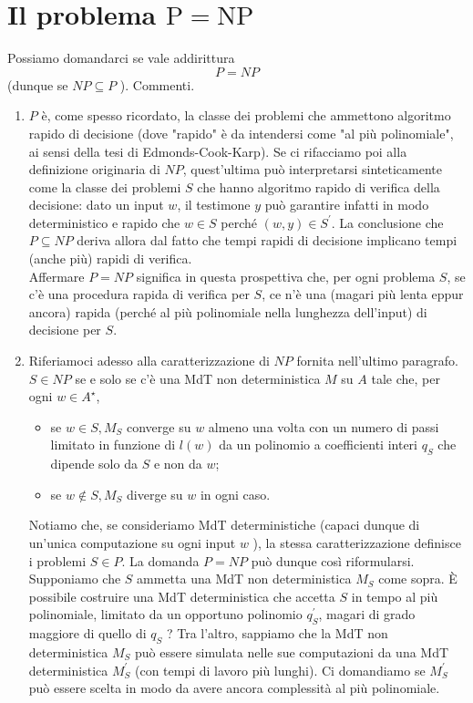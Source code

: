 \section{Il problema \texorpdfstring{$\mathrm{P}=\mathrm{NP}$}{P = NP}}

Possiamo domandarci se vale addirittura
$$
    P=N P
$$
(dunque se $N P \subseteq P$ ). Commenti.
\begin{enumerate}
    \item $P$ è, come spesso ricordato, la classe dei problemi che ammettono
          algoritmo rapido di decisione (dove "rapido" è da intendersi come "al più
          polinomiale", ai sensi della tesi di Edmonds-Cook-Karp). Se ci rifacciamo
          poi alla definizione originaria di $N P$, quest'ultima può interpretarsi
          sinteticamente come la classe dei problemi $S$ che hanno algoritmo rapido di
          verifica della decisione: dato un input $w$, il testimone $y$ può garantire
          infatti in modo deterministico e rapido che $w \in S$ perché $(w, y) \in
              S^{\prime}$.
          La conclusione che $P \subseteq N P$ deriva allora dal fatto che tempi
          rapidi di decisione implicano tempi (anche più) rapidi di verifica.\\
          Affermare $P=N P$ significa in questa prospettiva che, per ogni
          problema $S$, se c'è una procedura rapida di verifica per $S$, ce n'è
          una (magari più lenta eppur ancora) rapida (perché al più polinomiale
          nella lunghezza dell'input) di decisione per $S$.
    \item Riferiamoci adesso alla caratterizzazione di $N P$ fornita nell'ultimo
          paragrafo. $S \in N P$ se e solo se c'è una MdT non deterministica $M$ su
          $A$ tale che, per ogni $w \in A^{\star}$,
          \begin{itemize}
              \item se $w \in S, M_S$ converge su $w$ almeno una volta con un
                    numero di passi limitato in funzione di $l(w)$ da un polinomio a
                    coefficienti interi $q_S$ che dipende solo da $S$ e non da $w$;
              \item se $w \notin S, M_S$ diverge su $w$ in ogni caso.
          \end{itemize}

          Notiamo che, se consideriamo MdT deterministiche (capaci dunque di
          un'unica computazione su ogni input $w$ ), la stessa caratterizzazione
          definisce i problemi $S \in P$. La domanda $P=N P$ può dunque così
          riformularsi. Supponiamo che $S$ ammetta una MdT non deterministica
          $M_S$ come sopra. È possibile costruire una MdT deterministica che
          accetta $S$ in tempo al più polinomiale, limitato da un opportuno
          polinomio $q^{\prime}_S$, magari di grado maggiore di quello di $q_S$
          ? Tra l'altro, sappiamo che la MdT non deterministica $M_S$ può essere
          simulata nelle sue computazioni da una MdT deterministica $M^{\prime}_S$ (con
          tempi di lavoro più lunghi). Ci domandiamo se $M_S^{\prime}$ può essere
          scelta in modo da avere ancora complessità al più polinomiale.
\end{enumerate}


